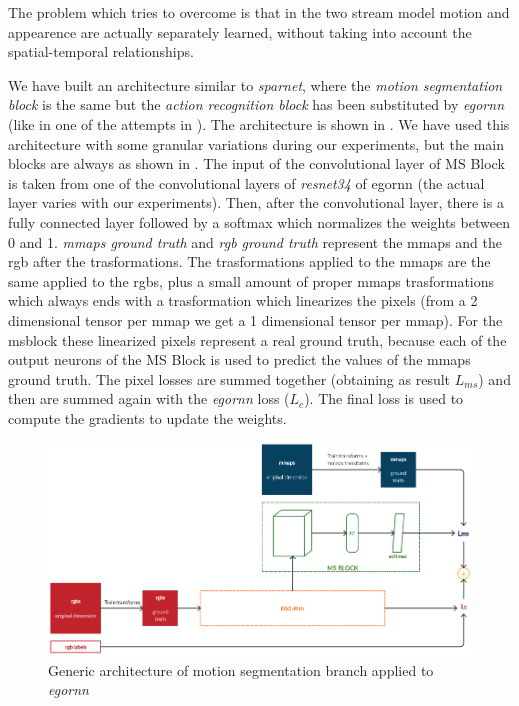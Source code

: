 \documentclass[10pt,twocolumn,hidelinks,letterpaper]{article}
\begin{document}
The problem which \cite{sparnet} tries to overcome is that in the two stream model motion and appearence are actually separately learned, without taking into account the spatial-temporal relationships.

We have built an architecture similar to \textit{sparnet}, where the \textit{motion segmentation block} is the same but the \textit{action recognition block} has been substituted by \textit{egornn} (like in one of the attempts in \cite{sparnet}). The architecture is shown in . We have used this architecture with some granular variations during our experiments, but the main blocks are always as shown in . The input of the convolutional layer of MS Block is taken from one of the convolutional layers of \textit{resnet34} of egornn (the actual layer varies with our experiments). Then, after the convolutional layer, there is a fully connected layer followed by a softmax which normalizes the weights between 0 and 1. \textit{mmaps ground truth} and \textit{rgb ground truth} represent the mmaps and the rgb after the trasformations. The trasformations applied to the mmaps are the same applied to the rgbs, plus a small amount of proper mmaps trasformations which always ends with a trasformation which linearizes the pixels (from a 2 dimensional tensor per mmap we get a 1 dimensional tensor per mmap). For the msblock these linearized pixels represent a real ground truth, because each of the output neurons of the MS Block is used to predict the values of the mmaps ground truth. The pixel losses are summed together (obtaining as result $L_{ms}$) and then are summed again with the \textit{egornn} loss ($L_c$). The final loss is used to compute the gradients to update the weights.

\begin{figure}
	\centering
	\includegraphics[width=\linewidth]{images/egornn+msblock_architecture.png}
	\caption{Generic architecture of motion segmentation branch applied to \textit{egornn}}
	\label{msblock_arch}
\end{figure}
\end{document}
